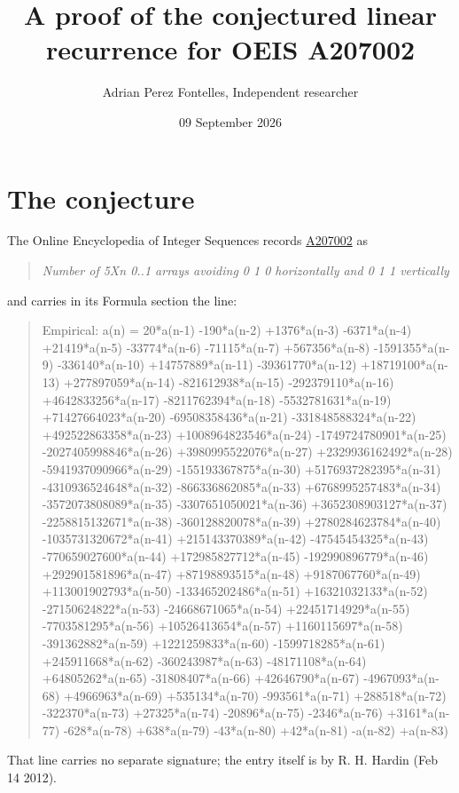 \documentclass[11pt]{article}
\title{A proof of the conjectured linear recurrence for OEIS A207002}
\author{Adrian Perez Fontelles, Independent researcher}
\date{09 September 2026}
\theoremstyle{definition}
\begin{document}
\maketitle
\section{The conjecture}

The Online Encyclopedia of Integer Sequences records \href{https://oeis.org/A207002}{A207002} as

\begin{quote}\itshape Number of 5Xn 0..1 arrays avoiding 0 1 0 horizontally and 0 1 1 vertically\end{quote}

and carries in its Formula section the line:

\begin{quote}\ttfamily Empirical: a(n) = 20*a(n-1) -190*a(n-2) +1376*a(n-3) -6371*a(n-4) +21419*a(n-5) -33774*a(n-6) -71115*a(n-7) +567356*a(n-8) -1591355*a(n-9) -336140*a(n-10) +14757889*a(n-11) -39361770*a(n-12) +18719100*a(n-13) +277897059*a(n-14) -821612938*a(n-15) -292379110*a(n-16) +4642833256*a(n-17) -8211762394*a(n-18) -5532781631*a(n-19) +71427664023*a(n-20) -69508358436*a(n-21) -331848588324*a(n-22) +492522863358*a(n-23) +1008964823546*a(n-24) -1749724780901*a(n-25) -2027405998846*a(n-26) +3980995522076*a(n-27) +2329936162492*a(n-28) -5941937090966*a(n-29) -155193367875*a(n-30) +5176937282395*a(n-31) -4310936524648*a(n-32) -866336862085*a(n-33) +6768995257483*a(n-34) -3572073808089*a(n-35) -3307651050021*a(n-36) +3652308903127*a(n-37) -2258815132671*a(n-38) -360128820078*a(n-39) +2780284623784*a(n-40) -1035731320672*a(n-41) +215143370389*a(n-42) -47545454325*a(n-43) -770659027600*a(n-44) +172985827712*a(n-45) -192990896779*a(n-46) +292901581896*a(n-47) +87198893515*a(n-48) +9187067760*a(n-49) +113001902793*a(n-50) -133465202486*a(n-51) +16321032133*a(n-52) -27150624822*a(n-53) -24668671065*a(n-54) +22451714929*a(n-55) -7703581295*a(n-56) +10526413654*a(n-57) +1160115697*a(n-58) -391362882*a(n-59) +1221259833*a(n-60) -1599718285*a(n-61) +245911668*a(n-62) -360243987*a(n-63) -48171108*a(n-64) +64805262*a(n-65) -31808407*a(n-66) +42646790*a(n-67) -4967093*a(n-68) +4966963*a(n-69) +535134*a(n-70) -993561*a(n-71) +288518*a(n-72) -322370*a(n-73) +27325*a(n-74) -20896*a(n-75) -2346*a(n-76) +3161*a(n-77) -628*a(n-78) +638*a(n-79) -43*a(n-80) +42*a(n-81) -a(n-82) +a(n-83)\end{quote}

That line carries no separate signature; the entry itself is by R. H. Hardin (Feb 14 2012).
\end{document}
